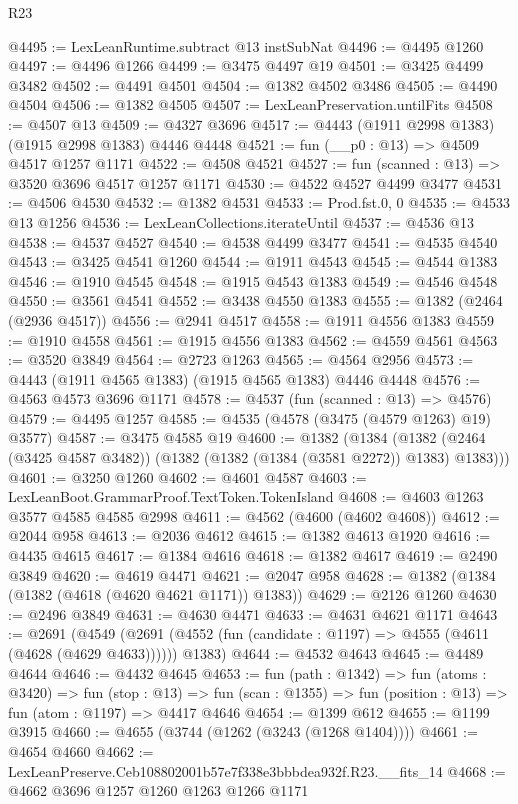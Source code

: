 \begin{lexlean}{R23}
\begin{coremodule}
@4495 := LexLeanRuntime.subtract @13 instSubNat
@4496 := @4495 @1260
@4497 := @4496 @1266
@4499 := @3475 @4497 @19
@4501 := @3425 @4499 @3482
@4502 := @4491 @4501
@4504 := @1382 @4502 @3486
@4505 := @4490 @4504
@4506 := @1382 @4505
@4507 := LexLeanPreservation.untilFits
@4508 := @4507 @13
@4509 := @4327 @3696
@4517 := @4443 (@1911 @2998 @1383) (@1915 @2998 @1383) @4446 @4448
@4521 := fun (__p0 : @13) => @4509 @4517 @1257 @1171
@4522 := @4508 @4521
@4527 := fun (scanned : @13) => @3520 @3696 @4517 @1257 @1171
@4530 := @4522 @4527 @4499 @3477
@4531 := @4506 @4530
@4532 := @1382 @4531
@4533 := Prod.fst.{0, 0}
@4535 := @4533 @13 @1256
@4536 := LexLeanCollections.iterateUntil
@4537 := @4536 @13
@4538 := @4537 @4527
@4540 := @4538 @4499 @3477
@4541 := @4535 @4540
@4543 := @3425 @4541 @1260
@4544 := @1911 @4543
@4545 := @4544 @1383
@4546 := @1910 @4545
@4548 := @1915 @4543 @1383
@4549 := @4546 @4548
@4550 := @3561 @4541
@4552 := @3438 @4550 @1383
@4555 := @1382 (@2464 (@2936 @4517))
@4556 := @2941 @4517
@4558 := @1911 @4556 @1383
@4559 := @1910 @4558
@4561 := @1915 @4556 @1383
@4562 := @4559 @4561
@4563 := @3520 @3849
@4564 := @2723 @1263
@4565 := @4564 @2956
@4573 := @4443 (@1911 @4565 @1383) (@1915 @4565 @1383) @4446 @4448
@4576 := @4563 @4573 @3696 @1171
@4578 := @4537 (fun (scanned : @13) => @4576)
@4579 := @4495 @1257
@4585 := @4535 (@4578 (@3475 (@4579 @1263) @19) @3577)
@4587 := @3475 @4585 @19
@4600 := @1382
    (@1384 (@1382 (@2464 (@3425 @4587 @3482)) (@1382 (@1382 (@1384 (@3581 @2272)) @1383) @1383)))
@4601 := @3250 @1260
@4602 := @4601 @4587
@4603 := LexLeanBoot.GrammarProof.TextToken.TokenIsland
@4608 := @4603 @1263 @3577 @4585 @4585 @2998
@4611 := @4562 (@4600 (@4602 @4608))
@4612 := @2044 @958
@4613 := @2036 @4612
@4615 := @1382 @4613 @1920
@4616 := @4435 @4615
@4617 := @1384 @4616
@4618 := @1382 @4617
@4619 := @2490 @3849
@4620 := @4619 @4471
@4621 := @2047 @958
@4628 := @1382 (@1384 (@1382 (@4618 (@4620 @4621 @1171)) @1383))
@4629 := @2126 @1260
@4630 := @2496 @3849
@4631 := @4630 @4471
@4633 := @4631 @4621 @1171
@4643 := @2691
    (@4549 (@2691 (@4552 (fun (candidate : @1197) => @4555 (@4611 (@4628 (@4629 @4633)))))) @1383)
@4644 := @4532 @4643
@4645 := @4489 @4644
@4646 := @4432 @4645
@4653 := fun (path : @1342) =>
  fun (atoms : @3420) =>
  fun (stop : @13) =>
  fun (scan : @1355) => fun (position : @13) => fun (atom : @1197) => @4417 @4646
@4654 := @1399 @612
@4655 := @1199 @3915
@4660 := @4655 (@3744 (@1262 (@3243 (@1268 @1404))))
@4661 := @4654 @4660
@4662 := LexLeanPreserve.Ceb108802001b57e7f338e3bbbdea932f.R23.__fits_14
@4668 := @4662 @3696 @1257 @1260 @1263 @1266 @1171

\end{coremodule}
\end{lexlean}
